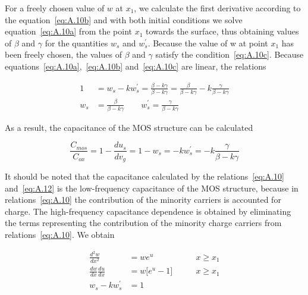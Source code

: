 For a freely chosen value of $w$ at $x_1$, we calculate the first
derivative according to the equation~\ref{eq:A.10b} and with both
initial conditions we solve equation~\ref{eq:A.10a} from the point
$x_1$ towards the surface, thus obtaining values of $\beta$ and
$\gamma$ for the quantities $w_s$ and $w^{'}_s$.  Because the value of
w at point $x_1$ has been freely chosen, the values of $\beta$ and
$\gamma$ satisfy the condition~\ref{eq:A.10c}. Because
equations~\ref{eq:A.10a},~\ref{eq:A.10b} and~\ref{eq:A.10c} are
linear, the relations

\begin{samepage}
  \begin{subequations}\label{eq:A.11}
    \begin{align}
      1 &= w_s - kw^{'}_s = \frac{\beta - k\gamma}{\beta - k\gamma} = \frac{\beta}{\beta -k\gamma} - k\frac{\gamma}{\beta -k\gamma} \\[0.3cm]
      w_s &= \frac{\beta}{\beta -k\gamma} \qquad w^{'}_s = \frac{\gamma}{\beta -k\gamma}
    \end{align}
  \end{subequations}
\end{samepage}

As a result, the capacitance of the MOS structure can be calculated

\begin{equation}\label{eq:A.12}
  \frac{C_{mos}}{C_{ox}} = 1 - \frac{du_s}{dv_g} = 1 - w_s = -kw^{'}_s = -k\frac{\gamma}{\beta - k\gamma}
\end{equation}

It should be noted that the capacitance calculated by the relations~\ref{eq:A.10}
and~\ref{eq:A.12} is the low-frequency capacitance of the MOS structure, because in
relations~\ref{eq:A.10} the contribution of the minority carriers is accounted for
charge. The high-frequency capacitance dependence is obtained by eliminating
the terms representing the contribution of the minority charge carriers from
relations~\ref{eq:A.10}. We obtain

\begin{samepage}
  \begin{subequations}\label{eq:A.13}
    \begin{align}
      \frac{d^{2}w}{dx^{2}} &= we^{u} \qquad &{x\ge{x_1}}                 \label{eq:A.13a} \\[0.3cm]
      \frac{dw}{dx}\frac{du}{dx} &= w \big[e^u-1\big] \qquad &{x\ge{x_1}} \label{eq:A.13b} \\[0.3cm]
      w_s-kw_s^{'} &= 1 \label{eq:A.13c}
    \end{align}
  \end{subequations}
\end{samepage}

